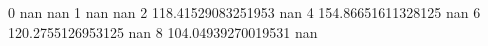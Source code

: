 0 nan nan
1 nan nan
2 118.41529083251953 nan
4 154.86651611328125 nan
6 120.2755126953125 nan
8 104.04939270019531 nan

